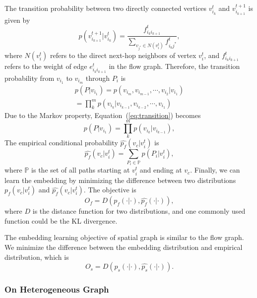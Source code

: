 The transition probability between two directly connected vertices  $v_{i_k}^t$ and $v_{i_{k+1}}^{t+1}$ is given by
\begin{equation}
\label{eq:pair-prob}
p(v_{i_{k+1}}^{t+1} | v_{i_k}^t) = \frac{f_{i_k i_{k+1}}^t} {\sum_{v_{j^*}\in N(v_i^t)} f_{i_k j^*}^t},
\end{equation}
where $N(v_i^t)$ refers to the direct next-hop neighbors of vertex $v_i^t$, and $f_{i_k i_{k+1}}^t$ refers to the weight of edge $e_{i_k i_{k+1}}^t$ in the flow graph. Therefore, the transition probability from $v_{i_1}$ to $v_{i_m}$ through $P_i$ is
\begin{multline}
\label{eq:transition}
p(P |v_{i_1}) = p(v_{i_m}, v_{i_{m-1}}, \cdots, v_{i_2} | v_{i_1}) \\
= \prod_{k}^m p(v_{i_k} | v_{i_{k-1}}, v_{i_{k-2}}, \cdots, v_{i_1})
\end{multline}
Due to the Markov property, Equation~(\ref{eq:transition}) becomes
\begin{equation}
p(P | v_{i_1}) = \prod_k^m p( v_{i_k} | v_{i_{k-1}}),
\end{equation}
The empirical conditional probability $\hat{p_f}(v_c | v_i^t)$ is
\begin{equation}
\label{eq:cp_emp}
\hat{p_f}(v_c|v_i^t) = \sum_{P_i \in \mathbb{P}} p(P_i | v_i^t),
\end{equation}
where $\mathbb{P}$ is the set of all paths starting at $v_i^t$ and ending at $v_c$.
Finally, we can learn the embedding by minimizing the difference between two distributions $p_f(v_c|v_i^t)$ and $\hat{p_f}(v_c | v_i^t)$. The objective is
\begin{equation}
\label{eq:obj_gt}
O_f = D(p_f(\cdot|\cdot), \hat{p_f}(\cdot|\cdot)),
\end{equation}
where $D$ is the distance function for two distributions, and one commonly used function could be the KL divergence. 



The embedding learning objective of spatial graph is similar to the flow graph. We minimize the difference between the embedding distribution and empirical distribution, which is
\begin{equation}
\label{eq:obj_gs}
O_s = D(p_s(\cdot|\cdot), \hat{p_s}(\cdot|\cdot)).
\end{equation}


\subsubsection{On Heterogeneous Graph}

